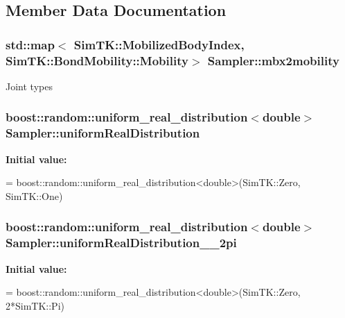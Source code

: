\subsection{Member Data Documentation}
\subsubsection[{\texorpdfstring{mbx2mobility}{mbx2mobility}}]{\setlength{\rightskip}{0pt plus 5cm}std\+::map$<$ Sim\+T\+K\+::\+Mobilized\+Body\+Index, Sim\+T\+K\+::\+Bond\+Mobility\+::\+Mobility$>$ Sampler\+::mbx2mobility}\hypertarget{classSampler_a795db0c66f3527f447f899f552c30a8b}{}\label{classSampler_a795db0c66f3527f447f899f552c30a8b}
Joint types 
\subsubsection[{\texorpdfstring{uniform\+Real\+Distribution}{uniformRealDistribution}}]{\setlength{\rightskip}{0pt plus 5cm}boost\+::random\+::uniform\+\_\+real\+\_\+distribution$<$double$>$ Sampler\+::uniform\+Real\+Distribution}\hypertarget{classSampler_a8f26cbe054715a164a8a0e0cc5226690}{}\label{classSampler_a8f26cbe054715a164a8a0e0cc5226690}
{\bfseries Initial value\+:}
\begin{DoxyCode}
=
            boost::random::uniform\_real\_distribution<double>(SimTK::Zero, SimTK::One)
\end{DoxyCode}
\subsubsection[{\texorpdfstring{uniform\+Real\+Distribution\+\_\+0\+\_\+2pi}{uniformRealDistribution_0_2pi}}]{\setlength{\rightskip}{0pt plus 5cm}boost\+::random\+::uniform\+\_\+real\+\_\+distribution$<$double$>$ Sampler\+::uniform\+Real\+Distribution\+\_\+\_\+2pi}\hypertarget{classSampler_acf6ddd3830ce3ea8ac991f0d6c42325b}{}\label{classSampler_acf6ddd3830ce3ea8ac991f0d6c42325b}
{\bfseries Initial value\+:}
\begin{DoxyCode}
=
            boost::random::uniform\_real\_distribution<double>(SimTK::Zero, 2*SimTK::Pi)
\end{DoxyCode}
